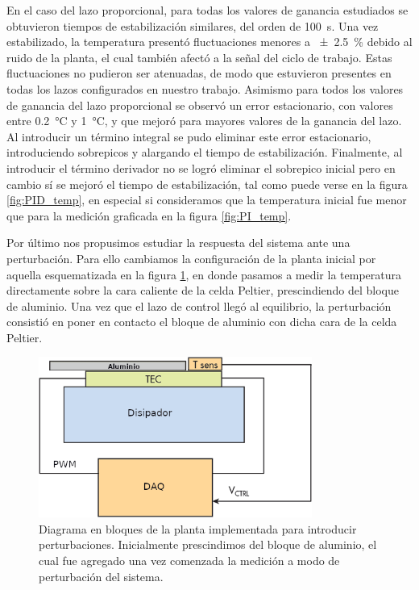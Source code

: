 \documentclass[a4paper,11pt]{article}
\begin{document}
En el caso del lazo proporcional, para todas los valores de ganancia estudiados se obtuvieron tiempos de estabilización similares, del orden de \SI{100}{\s}. Una vez estabilizado, la temperatura presentó fluctuaciones menores a \SI{\pm 2.5}{\percent} debido al ruido de la planta, el cual también afectó a la señal del ciclo de trabajo. Estas fluctuaciones no pudieron ser atenuadas, de modo que estuvieron presentes en todas los lazos configurados en nuestro trabajo. Asimismo para todos los valores de ganancia del lazo proporcional se observó un error estacionario, con valores entre \SI{0.2}{\celsius} y \SI{1}{\celsius}, y que mejoró para mayores valores de la ganancia del lazo. Al introducir un término integral se pudo eliminar este error estacionario, introduciendo sobrepicos y alargando el tiempo de estabilización. Finalmente, al introducir el término derivador no se logró eliminar el sobrepico inicial pero en cambio sí se mejoró el tiempo de estabilización, tal como puede verse en la figura \ref{fig:PID_temp}, en especial si consideramos que la temperatura inicial fue menor que para la medición graficada en la figura \ref{fig:PI_temp}.

Por último nos propusimos estudiar la respuesta del sistema ante una perturbación. Para ello cambiamos la configuración de la planta inicial por aquella esquematizada en la figura \ref{fig:planta2}, en donde pasamos a medir la temperatura directamente sobre la cara caliente de la celda Peltier, prescindiendo del bloque de aluminio. Una vez que el lazo de control llegó al equilibrio, la perturbación consistió en poner en contacto el bloque de aluminio con dicha cara de la celda Peltier.

\begin{figure}[h!]
\centering
\includegraphics[width=0.8\textwidth]{figs/Planta2}
\caption{Diagrama en bloques de la planta implementada para introducir perturbaciones. Inicialmente prescindimos del bloque de aluminio, el cual fue agregado una vez comenzada la medición a modo de perturbación del sistema.}
\label{fig:planta2}
\end{figure}
\end{document}
